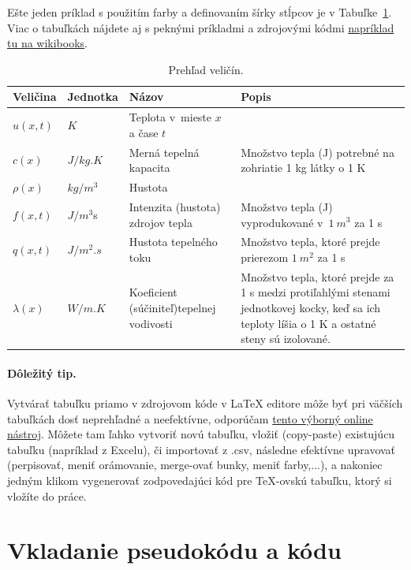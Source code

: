 Ešte jeden príklad s použitím farby a definovaním šírky stĺpcov je v Tabuľke~\ref{tab:Veliciny}. Viac o tabuľkách nájdete aj s peknými príkladmi a zdrojovými kódmi \href{https://en.wikibooks.org/wiki/LaTeX/Tables#Basic_examples}{napríklad tu na wikibooks}.
\begin{table}[h]
	\centering
	\caption{Prehľad veličín.} \label{tab:Veliciny}
	\begin{tabular}{|l|l|p{45mm}|p{60mm}|}
		\hline
		\rowcolor[gray]{.8}
		Veličina & Jednotka & Názov & Popis  \\ \hline
		$u(x,t)$ & $\si{K}$ & Teplota v~mieste $x$ a čase $t$ &   \\ \hline
		$c(x)$ & $\si{J/kg.K}$ & Merná tepelná kapacita & Množstvo tepla (J) potrebné na zohriatie 1 kg látky o 1 K  \\ \hline
		$\rho(x)$ & $\si{kg/m^3}$ & Hustota &  \\ \hline
		$f(x,t)$ & $\si{J/m^3}$s & Intenzita (hustota) \newline zdrojov tepla & Množstvo tepla (J) vyprodukované v~$\SI{1}{m^3}$ za 1 s   \\ \hline
		$q(x,t)$ & $\si{J/m^2.s}$ & Hustota tepelného toku & Množstvo tepla, ktoré prejde prierezom $\SI{1}{m^2}$ za 1 s  \\ \hline
		$\lambda(x)$ & $\si{W/m.K}$ & Koeficient (súčiniteľ)\newline tepelnej vodivosti & Množstvo tepla, ktoré prejde za 1 s medzi protiľahlými stenami jednotkovej kocky, keď sa ich teploty líšia o 1 K a ostatné steny sú izolované. \\ \hline
	\end{tabular}
\end{table}

\paragraph{Dôležitý tip.}
Vytvárať tabuľku priamo v zdrojovom kóde v LaTeX editore môže byť pri väčších tabuľkách dosť neprehľadné a neefektívne, odporúčam \href{https://www.tablesgenerator.com/}{tento výborný online nástroj}. Môžete tam ľahko vytvoriť novú tabuľku, vložiť (copy-paste) existujúcu tabuľku (napríklad z Excelu), či importovať z .csv, následne efektívne upravovať (perpisovať, meniť orámovanie, merge-ovať bunky, meniť farby,...), a nakoniec jedným klikom vygenerovať zodpovedajúci kód pre TeX-ovskú tabuľku, ktorý si vložíte do práce.

\section{Vkladanie pseudokódu a kódu}

